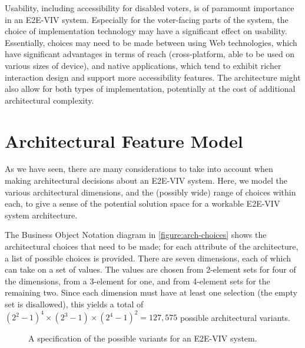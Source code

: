 
Usability, including accessibility for disabled voters, is of
paramount importance in an E2E-VIV system. Especially for the
voter-facing parts of the system, the choice of implementation
technology may have a significant effect on usability. Essentially,
choices may need to be made between using Web technologies, which have
significant advantages in terms of reach (cross-platform, able to be
used on various sizes of device), and native applications, which tend
to exhibit richer interaction design and support more accessibility
features. The architecture might also allow for both types of
implementation, potentially at the cost of additional architectural
complexity.

\section{Architectural Feature Model}

As we have seen, there are many considerations to take into account
when making architectural decisions about an E2E-VIV system. Here, we
model the various architectural dimensions, and the (possibly wide)
range of choices within each, to give a sense of the potential
solution space for a workable E2E-VIV system architecture.

The Business Object Notation diagram in \autoref{figure:arch-choices}
shows the architectural choices that need to be made; for each
attribute of the architecture, a list of possible choices is
provided. There are seven dimensions, each of which can take on a set
of values. The values are chosen from 2-element sets for four of the
dimensions, from a 3-element for one, and from 4-element sets for the
remaining two. Since each dimension must have at least one selection
(the empty set is disallowed), this yields a total of
$(2^2-1)^4\times(2^3-1)\times(2^4-1)^2=127,\!575$ possible
architectural variants.

\begin{figure}
\begin{center}

\end{center}
\caption{A specification of the possible variants for an E2E-VIV system.}
\label{figure:arch-choices}
\end{figure}

